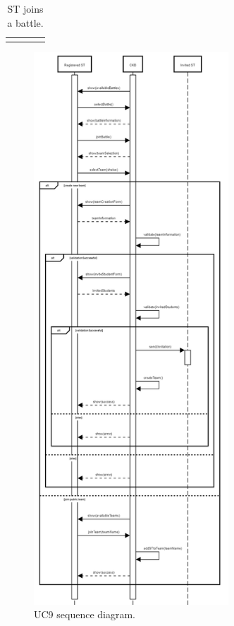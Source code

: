 \begin{center}
\begin{longtable}{l|p{0.75\linewidth}}
    \hline
    \caption{ST joins a battle.}
    \label{tab: ST_join_battle}
  \end{longtable}

  \begin{figure} [H]
    \begin{center}
        \includegraphics[width=0.65\textwidth,height=\textheight,keepaspectratio]{Images/SequenceDiagrams/UC9.png}
        \caption{UC9 sequence diagram.}
        \label{fig: UC9_sequence_diagram}
    \end{center}
  \end{figure}
\end{center}

